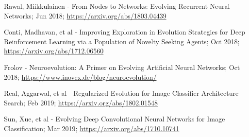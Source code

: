 \documentclass[journal, a4paper]{IEEEtran}
\begin{document}
\begin{thebibliography}{5}
    Rawal, Miikkulainen - From Nodes to Networks: Evolving Recurrent Neural Networks; Jun 2018;
    \url{https://arxiv.org/abs/1803.04439}

    Conti, Madhavan, et al - Improving Exploration in Evolution Strategies for Deep Reinforcement Learning via a Population of Novelty Seeking Agents; Oct 2018;
    \url{https://arxiv.org/abs/1712.06560}

    Frolov - Neuroevolution: A Primer on Evolving Artificial Neural Networks; Oct 2018;
    \url{https://www.inovex.de/blog/neuroevolution/}

    Real, Aggarwal, et al - Regularized Evolution for Image Classifier Architecture Search; Feb 2019;
    \url{https://arxiv.org/abs/1802.01548}

    Sun, Xue, et al - Evolving Deep Convolutional Neural Networks for Image Classification; Mar 2019;
    \url{https://arxiv.org/abs/1710.10741}



\end{thebibliography}
\end{document}
